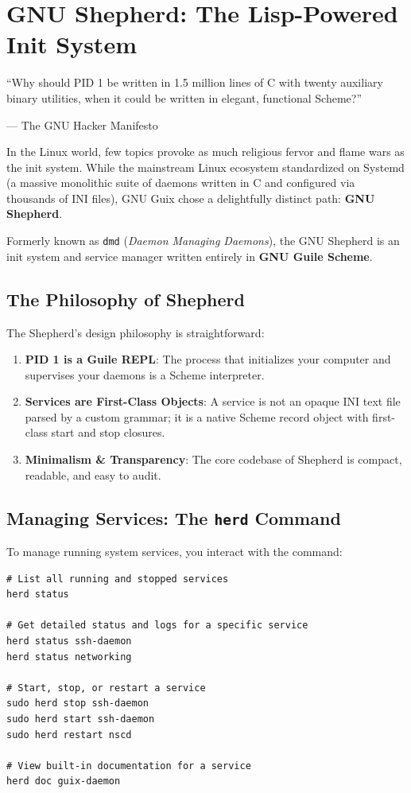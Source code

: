 \chapter{GNU Shepherd: The Lisp-Powered Init System}
\label{chap:shepherd}

\epigraph{``Why should PID 1 be written in 1.5 million lines of C with twenty auxiliary binary utilities, when it could be written in elegant, functional Scheme?''}{--- The GNU Hacker Manifesto}

\noindent
In the Linux world, few topics provoke as much religious fervor and flame wars as the init system. While the mainstream Linux ecosystem standardized on Systemd (a massive monolithic suite of daemons written in C and configured via thousands of INI files), GNU Guix chose a delightfully distinct path: \textbf{GNU Shepherd}.

Formerly known as \texttt{dmd} (\emph{Daemon Managing Daemons}), the GNU Shepherd is an init system and service manager written entirely in \textbf{GNU Guile Scheme}.

\section{The Philosophy of Shepherd}

The Shepherd's design philosophy is straightforward:
\begin{enumerate}
  \item \textbf{PID 1 is a Guile REPL}: The process that initializes your computer and supervises your daemons is a Scheme interpreter.
  \item \textbf{Services are First-Class Objects}: A service is not an opaque INI text file parsed by a custom grammar; it is a native Scheme record object with first-class start and stop closures.
  \item \textbf{Minimalism \& Transparency}: The core codebase of Shepherd is compact, readable, and easy to audit.
\end{enumerate}

\section{Managing Services: The \texttt{herd} Command}

To manage running system services, you interact with the  command:

\begin{lstlisting}[style=guixcli]
# List all running and stopped services
herd status

# Get detailed status and logs for a specific service
herd status ssh-daemon
herd status networking

# Start, stop, or restart a service
sudo herd stop ssh-daemon
sudo herd start ssh-daemon
sudo herd restart nscd

# View built-in documentation for a service
herd doc guix-daemon
\end{lstlisting}

